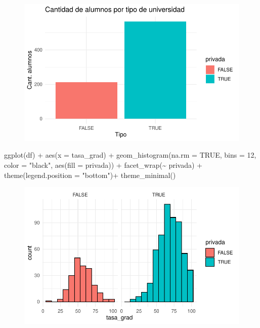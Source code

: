\documentclass[
  letterpaper,
  DIV=11,
  numbers=noendperiod]{scrartcl}
\newenvironment{Shaded}{\begin{snugshade}}{\end{snugshade}}
\newcommand{\AttributeTok}[1]{\textcolor[rgb]{0.40,0.45,0.13}{#1}}
\newcommand{\ConstantTok}[1]{\textcolor[rgb]{0.56,0.35,0.01}{#1}}
\newcommand{\DecValTok}[1]{\textcolor[rgb]{0.68,0.00,0.00}{#1}}
\newcommand{\FunctionTok}[1]{\textcolor[rgb]{0.28,0.35,0.67}{#1}}
\newcommand{\NormalTok}[1]{\textcolor[rgb]{0.00,0.23,0.31}{#1}}
\newcommand{\SpecialCharTok}[1]{\textcolor[rgb]{0.37,0.37,0.37}{#1}}
\newcommand{\StringTok}[1]{\textcolor[rgb]{0.13,0.47,0.30}{#1}}
\begin{document}
\begin{figure}[H]

{\centering \includegraphics{TP_final_files/figure-pdf/unnamed-chunk-5-1.pdf}

}

\end{figure}

\begin{Shaded}
\begin{Highlighting}[]
\FunctionTok{ggplot}\NormalTok{(df) }\SpecialCharTok{+}
  \FunctionTok{aes}\NormalTok{(}\AttributeTok{x =}\NormalTok{ tasa\_grad) }\SpecialCharTok{+} 
  \FunctionTok{geom\_histogram}\NormalTok{(}\AttributeTok{na.rm =} \ConstantTok{TRUE}\NormalTok{, }\AttributeTok{bins =} \DecValTok{12}\NormalTok{, }\AttributeTok{color =} \StringTok{"black"}\NormalTok{, }\FunctionTok{aes}\NormalTok{(}\AttributeTok{fill =}\NormalTok{ privada)) }\SpecialCharTok{+} 
  \FunctionTok{facet\_wrap}\NormalTok{(}\SpecialCharTok{\textasciitilde{}}\NormalTok{ privada) }\SpecialCharTok{+} 
  \FunctionTok{theme}\NormalTok{(}\AttributeTok{legend.position =} \StringTok{"bottom"}\NormalTok{)}\SpecialCharTok{+}
  \FunctionTok{theme\_minimal}\NormalTok{()}
\end{Highlighting}
\end{Shaded}

\begin{figure}[H]

{\centering \includegraphics{TP_final_files/figure-pdf/unnamed-chunk-6-1.pdf}

}

\end{figure}
\end{document}
